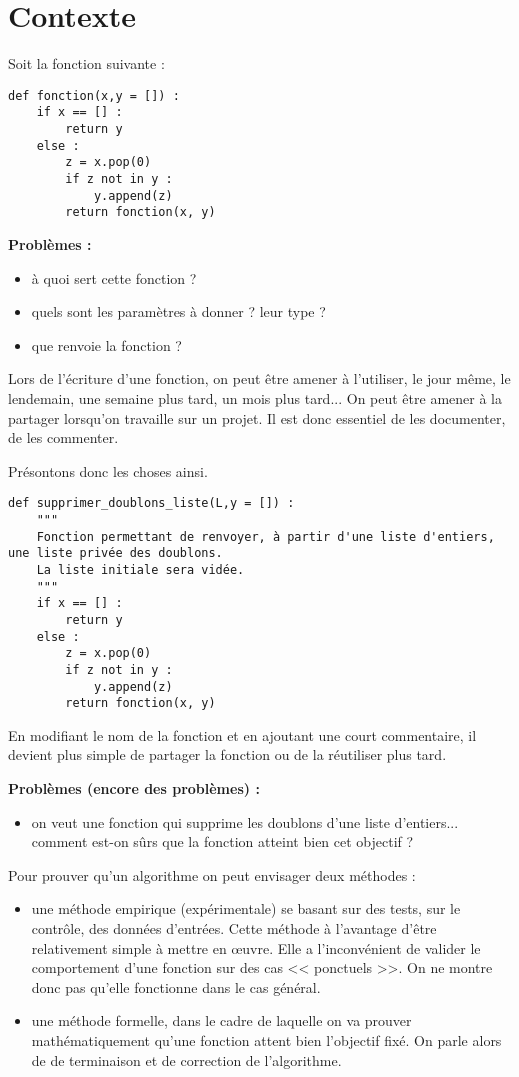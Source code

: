 \section{Contexte}
Soit la fonction suivante : 
\begin{lstlisting}
def fonction(x,y = []) :
    if x == [] : 
        return y
    else : 
        z = x.pop(0)
        if z not in y : 
            y.append(z)
        return fonction(x, y)
\end{lstlisting}

\textbf{Problèmes :}
\begin{itemize}
\item à quoi sert cette fonction ?
\item quels sont les paramètres à donner ? leur type ?
\item que renvoie la fonction ?
\end{itemize}

Lors de l'écriture d'une fonction, on peut être amener à l'utiliser, le jour même, le lendemain, une semaine plus tard, un mois plus tard... On peut être amener à la partager lorsqu'on travaille sur un projet. 
Il est donc essentiel de les documenter, de les commenter.

Présontons donc les choses ainsi. 

\begin{lstlisting}
def supprimer_doublons_liste(L,y = []) :
    """
    Fonction permettant de renvoyer, à partir d'une liste d'entiers, une liste privée des doublons. 
    La liste initiale sera vidée. 
    """
    if x == [] : 
        return y
    else : 
        z = x.pop(0)
        if z not in y : 
            y.append(z)
        return fonction(x, y)
\end{lstlisting}

En modifiant le nom de la fonction et en ajoutant une court commentaire, il devient plus simple de partager la fonction ou de la réutiliser plus tard. 

\textbf{Problèmes (encore des problèmes) :}
\begin{itemize}
\item on veut une fonction qui supprime les doublons d'une liste d'entiers... comment est-on sûrs que la fonction atteint bien cet objectif ?
\end{itemize}
 
Pour prouver qu'un algorithme on peut envisager deux méthodes : 
\begin{itemize}
\item une méthode empirique (expérimentale) se basant sur des tests, sur le contrôle, des données d'entrées. Cette méthode à l'avantage d'être relativement simple à mettre en \oe{}uvre. Elle a l'inconvénient de valider le comportement d'une fonction sur des cas << ponctuels >>. On ne montre donc pas qu'elle fonctionne dans le cas général. 
\item une méthode formelle, dans le cadre de laquelle on va prouver mathématiquement qu'une fonction attent bien l'objectif fixé. On parle alors de de terminaison et de correction de l'algorithme.
\end{itemize}


